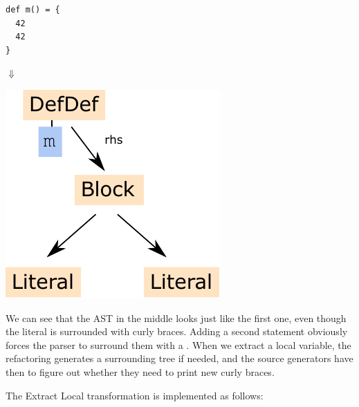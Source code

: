 \documentclass[10pt,a4paper,oneside]{scrreprt}
\begin{document}
\begin{multicols}{3}
\columnbreak

\begin{lstlisting}
def m() = { 
  42
  42
}
\end{lstlisting}

\begin{center}
  $\Downarrow$
\end{center}
\includegraphics[width=0.9\linewidth]{defdef_with_block.pdf}
\end{multicols}

We can see that the AST in the middle looks just like the first one, even though the literal is surrounded with curly braces. Adding a second statement obviously forces the parser to surround them with a . When we extract a local variable, the refactoring generates a surrounding  tree if needed, and the source generators have then to figure out whether they need to print new curly braces.

The Extract Local transformation is implemented as follows:
\end{document}
